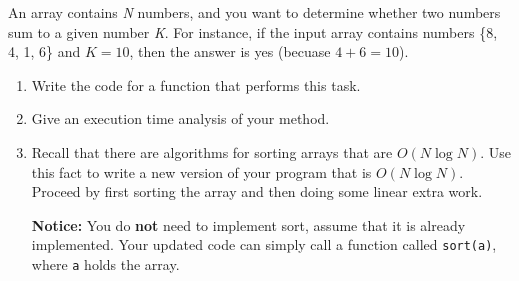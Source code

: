 \documentclass[a4paper]{article}
\begin{document}
An array contains \emph{N} numbers, and you want to determine whether two numbers sum to a given number \emph{K}.
For instance, if the input array contains numbers \{8, 4, 1, 6\} and $K = 10$, then the answer is yes (becuase $4 + 6 = 10$).

\begin{enumerate}
\item
  Write the code for a function that performs this task.
\item
  Give an execution time analysis of your method.
\item
  Recall that there are algorithms for sorting arrays that are $O(N \log N)$.
  Use this fact to write a new version of your program that is $O(N \log N)$.
  Proceed by first sorting the array and then doing some linear extra work.
  
  \textbf{Notice:} You do \textbf{not} need to implement sort, assume that it is already implemented.
  Your updated code can simply call a function called \texttt{sort(a)}, where \texttt{a} holds the array.
\end{enumerate}
\end{document}

